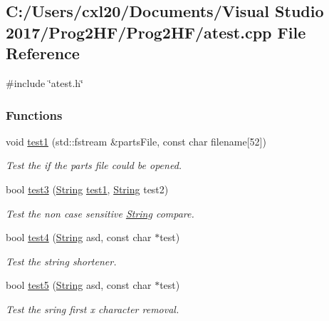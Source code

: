 \subsection{C\+:/\+Users/cxl20/\+Documents/\+Visual Studio 2017/\+Prog2\+H\+F/\+Prog2\+H\+F/atest.cpp File Reference}
\label{atest_8cpp}
{\ttfamily \#include \char`\"{}atest.\+h\char`\"{}}\newline
\subsubsection*{Functions}
\begin{DoxyCompactItemize}
\item 
void \mbox{\hyperlink{atest_8cpp_acdf8ec90b79eca8d516b03baa19a1b44}{test1}} (std\+::fstream \&parts\+File, const char filename\mbox{[}52\mbox{]})
\begin{DoxyCompactList}\small\item\em Test the if the parts file could be opened. \end{DoxyCompactList}\item 
bool \mbox{\hyperlink{atest_8cpp_a6e6df2af48d16780853d6eddcb8c8bc4}{test3}} (\mbox{\hyperlink{class_string}{String}} \mbox{\hyperlink{atest_8h_a377b49f7a65ef678441feafbbb111fd0}{test1}}, \mbox{\hyperlink{class_string}{String}} test2)
\begin{DoxyCompactList}\small\item\em Test the non case sensitive \mbox{\hyperlink{class_string}{String}} compare. \end{DoxyCompactList}\item 
bool \mbox{\hyperlink{atest_8cpp_ab545ece7a108a6470a3dc2161ba0008b}{test4}} (\mbox{\hyperlink{class_string}{String}} asd, const char $\ast$test)
\begin{DoxyCompactList}\small\item\em Test the string shortener. \end{DoxyCompactList}\item 
bool \mbox{\hyperlink{atest_8cpp_a07323edca3eb4730f312846bd8714d4a}{test5}} (\mbox{\hyperlink{class_string}{String}} asd, const char $\ast$test)
\begin{DoxyCompactList}\small\item\em Test the sring first x character removal. \end{DoxyCompactList}\end{DoxyCompactItemize}


